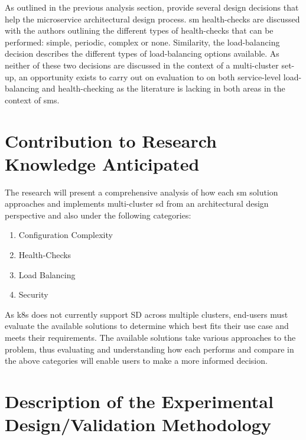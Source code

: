 \documentclass[12pt, a4paper, oneside]{article}
\begin{document}
As outlined in the previous analysis section, \cite{guidingAD} provide several design decisions that help the microservice architectural design process. \acrshort{sm} health-checks are discussed with the authors outlining the different types of health-checks that can be performed: simple, periodic, complex or none. Similarity, the load-balancing decision describes the different types of load-balancing options available. As neither of these two decisions are discussed in the context of a multi-cluster set-up, an opportunity exists to carry out on evaluation to on both service-level load-balancing and health-checking as the literature is lacking in both areas in the context of \acrshort{sm}s.
\newpage

\section{Contribution to Research Knowledge Anticipated}
The research will present a comprehensive analysis of how each \acrshort{sm} solution approaches and implements multi-cluster \acrshort{sd} from an architectural design perspective and also under the following categories:

\begin{enumerate}
	\item Configuration Complexity
	\item Health-Checks
	\item Load Balancing
	\item Security
\end{enumerate}

As \acrshort{k8s} does not currently support SD across multiple clusters, end-users must evaluate the available solutions to determine which best fits their use case and meets their requirements. The available solutions take various approaches to the problem, thus evaluating and understanding how each  performs and compare in the above categories will enable users to make a more informed decision. 
\newpage

\section{Description of the Experimental Design/Validation Methodology}
\end{document}
